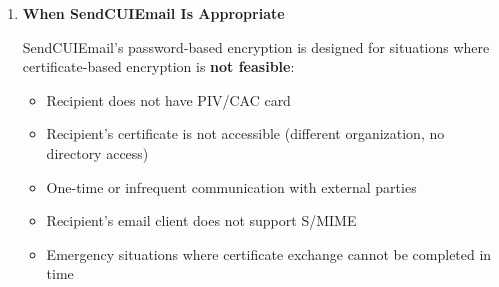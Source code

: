 \documentclass[11pt,letterpaper]{article}
\newcommand{\dmsection}[1]{\item \textbf{#1}\par}
\begin{document}
\begin{enumerate}
\textbf{How Certificate-Based Encryption Works:}
\begin{itemize}
    \item Sender encrypts using recipient's \textbf{public certificate} (can be sent via email---not secret)
    \item Only recipient can decrypt using their \textbf{private key} (never leaves PIV/CAC card)
    \item \textbf{No shared secret} exists, so no out-of-band transmission is required
    \item Provides non-repudiation and authentication
\end{itemize}

\textbf{Standards:}
\begin{itemize}
    \item \textbf{S/MIME} (Secure/Multipurpose Internet Mail Extensions)
    \item \textbf{OpenPGP} (Pretty Good Privacy)
    \item Both are referenced in NIST SP 800-45 for email security
\end{itemize}

\textbf{When to Use Certificate-Based Encryption:}
\begin{itemize}
    \item Recipient has PIV/CAC card with valid certificate
    \item Certificate can be obtained from directory service or key server
    \item Organization has PKI infrastructure in place
    \item Regular communication with same recipients
\end{itemize}

\dmsection{When SendCUIEmail Is Appropriate}

SendCUIEmail's password-based encryption is designed for situations where certificate-based encryption is \textbf{not feasible}:

\begin{itemize}
    \item Recipient does not have PIV/CAC card
    \item Recipient's certificate is not accessible (different organization, no directory access)
    \item One-time or infrequent communication with external parties
    \item Recipient's email client does not support S/MIME
    \item Emergency situations where certificate exchange cannot be completed in time
\end{itemize}


\end{enumerate}
\end{document}
